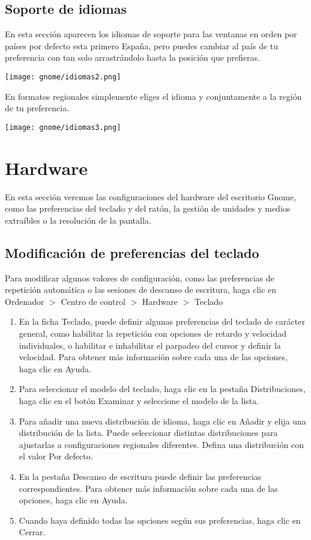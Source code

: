 \subsection{Soporte de idiomas}
En esta sección aparecen los idiomas de soporte para las ventanas en orden por países por defecto esta primero España, pero puedes cambiar al país de tu preferencia con tan solo arrastrándolo hasta la posición que prefieras.
\begin{center}
\texttt{[image: gnome/idiomas2.png]} 
\end{center}
En formatos regionales simplemente eliges el idioma y conjuntamente a la región de tu preferencia.
\begin{center}
\texttt{[image: gnome/idiomas3.png]} 
\end{center}
\section{Hardware}
En esta sección veremos las configuraciones del hardware del escritorio Gnome, como las preferencias del teclado y del ratón, la gestión de unidades y medios extraíbles o la resolución de la pantalla.
\subsection{Modificación de preferencias del teclado}
Para modificar algunos valores de configuración, como las preferencias de repetición
automática o las sesiones de descanso de escritura, haga clic en Ordenador $>$ Centro
de control $>$ Hardware $>$ Teclado
\begin{enumerate}
\item En la ficha Teclado, puede definir algunas preferencias del teclado de carácter general, como habilitar la repetición con opciones de retardo y velocidad individuales, o habilitar e inhabilitar el parpadeo del cursor y definir la velocidad. Para obtener más información sobre cada una de las opciones, haga clic en Ayuda.
\item Para seleccionar el modelo del teclado, haga clic en la pestaña Distribuciones, haga clic en el botón Examinar y seleccione el modelo de la lista.
\item Para añadir una nueva distribución de idioma, haga clic en Añadir y elija una distribución de la lista. Puede seleccionar distintas distribuciones para ajustarlas a configuraciones regionales diferentes. Defina una distribución con el valor Por defecto.
\item En la pestaña Descanso de escritura puede definir las preferencias correspondientes. Para obtener más información sobre cada una de las opciones, haga clic
en Ayuda.
\item Cuando haya definido todas las opciones según sus preferencias, haga clic en Cerrar.
\end{enumerate}
